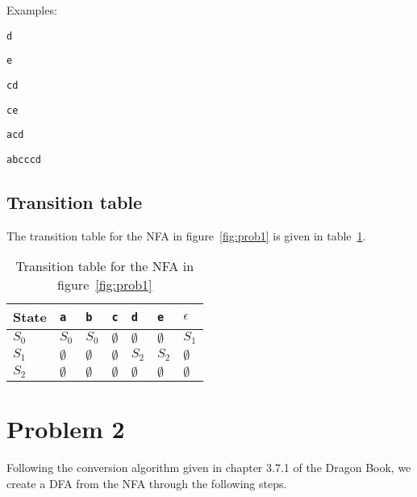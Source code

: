\documentclass[twoside]{article}
\begin{document}
\begin{multicols}{2}
Examples:

\begin{compactitem}
    \item \texttt{d}
    \item \texttt{e}
    \item \texttt{cd}
    \item \texttt{ce}
    \item \texttt{acd}
    \item \texttt{abcccd}
\end{compactitem}

\subsection{Transition table}

The transition table for the NFA in figure~\ref{fig:prob1} is given in table~\ref{tab:transition-table1}.

\begin{table}[H]
\centering
    \begin{tabular}{l|l|l|l|l|l|l}
    State       & \texttt{a}    & \texttt{b}    & \texttt{c}    & \texttt{d}    & \texttt{e}    & $\epsilon$    \\ \hline
    $S_0$       & $S_0$         & $S_0$         & $\emptyset$   & $\emptyset$   & $\emptyset$   & $S_1$         \\ \hline
    $S_1$       & $\emptyset$   & $\emptyset$   & $\emptyset$   & $S_2$         & $S_2$         & $\emptyset$   \\ \hline
    $S_2$       & $\emptyset$   & $\emptyset$   & $\emptyset$   & $\emptyset$   & $\emptyset$   & $\emptyset$   \\
    \end{tabular}
    \caption{Transition table for the NFA in figure~\ref{fig:prob1}} \label{tab:transition-table1}
\end{table}

\section{Problem 2}

Following the conversion algorithm given in chapter 3.7.1 of the Dragon Book, we create a DFA from the NFA through the following steps.

\begin{figure}[H]
\centering
{}
\end{figure}
\end{multicols}
\end{document}

